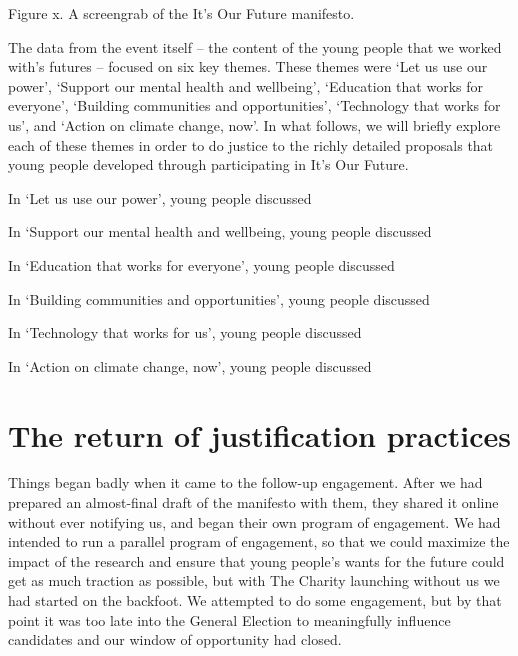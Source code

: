 Figure x. A screengrab of the It’s Our Future manifesto. 

The data from the event itself – the content of the young people that we worked with’s futures – focused on six key themes. These themes were ‘Let us use our power’, ‘Support our mental health and wellbeing’, ‘Education that works for everyone’, ‘Building communities and opportunities’, ‘Technology that works for us’, and ‘Action on climate change, now’. In what follows, we will briefly explore each of these themes in order to do justice to the richly detailed proposals that young people developed through participating in It’s Our Future.

In ‘Let us use our power’, young people discussed

In ‘Support our mental health and wellbeing, young people discussed

In ‘Education that works for everyone’, young people discussed

In ‘Building communities and opportunities’, young people discussed

In ‘Technology that works for us’, young people discussed

In ‘Action on climate change, now’, young people discussed

\section{The return of justification practices}

Things began badly when it came to the follow-up engagement. After we had prepared an almost-final draft of the manifesto with them, they shared it online without ever notifying us, and began their own program of engagement. We had intended to run a parallel program of engagement, so that we could maximize the impact of the research and ensure that young people’s wants for the future could get as much traction as possible, but with The Charity launching without us we had started on the backfoot. We attempted to do some engagement, but by that point it was too late into the General Election to meaningfully influence candidates and our window of opportunity had closed. 

